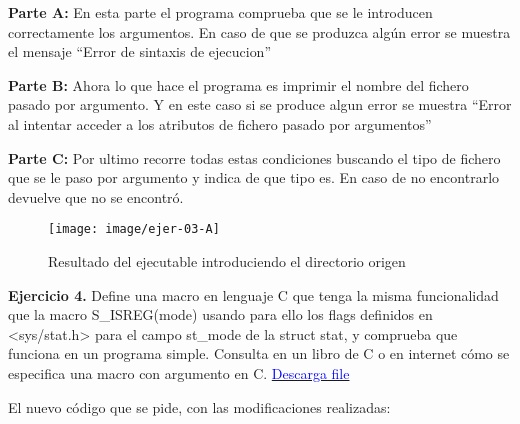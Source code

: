 \textbf{Parte A:} En esta parte el programa comprueba que se le introducen correctamente los argumentos. En caso de que se produzca algún error se muestra el mensaje ``Error de sintaxis de ejecucion'' \newline

\textbf{Parte B:} Ahora lo que hace el programa es imprimir el nombre del fichero pasado por argumento. Y en este caso si se produce algun error se muestra  ``Error al intentar acceder a los atributos de fichero pasado por argumentos'' \newline

\textbf{Parte C:} Por ultimo recorre todas estas condiciones buscando el tipo de fichero que se le paso por argumento y indica de que tipo es. En caso de no encontrarlo devuelve que no se encontró. \newline

\begin{figure}[H]
	\centering
	\texttt{[image: image/ejer-03-A]}
	\caption[Ejercicio 3.]{Resultado del ejecutable introduciendo el directorio origen}
	\label{fig:ejer-03-a}
\end{figure}

{\Large \textbf{Ejercicio 4.}} Define una macro en lenguaje C que tenga la misma funcionalidad que la macro
S\_ISREG(mode) usando para ello los flags definidos en <sys/stat.h> para el campo st\_mode de
la struct stat, y comprueba que funciona en un programa simple. Consulta en un libro de C o
en internet cómo se especifica una macro con argumento en C. \href{file: file/ejercicio_4.c}{\textcolor{Blue}{Descarga file}} \newline

El nuevo código que se pide, con las modificaciones realizadas: 

